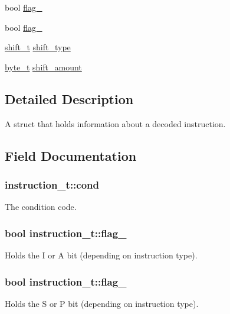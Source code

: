 \begin{DoxyCompactItemize}
\item 
bool \hyperlink{structinstruction__t_a185bd7654f18f654b666ccfe1d857659}{flag\+\_}
\item 
bool \hyperlink{structinstruction__t_a004b3ac9779d188ae99bc0c7180dab8d}{flag\+\_}
\item 
\hyperlink{global_8h_a22746cb89e8b2ed0a61876e36446f37f}{shift\+\_\+t} \hyperlink{structinstruction__t_a13483a9191b2197c4ed899f3889ad801}{shift\+\_\+type}
\item 
\hyperlink{global_8h_a0661d7d1353e0bca70c64563f635b034}{byte\+\_\+t} \hyperlink{structinstruction__t_ac6da93636b5b619f0ee7c5405b185e5d}{shift\+\_\+amount}
\end{DoxyCompactItemize}


\subsection{Detailed Description}
A struct that holds information about a decoded instruction. 

\subsection{Field Documentation}
\subsubsection[{\texorpdfstring{cond}{cond}}]{ instruction\+\_\+t\+::cond}\hypertarget{structinstruction__t_aafe48ca203b375c2b6373abd11192c3f}{}\label{structinstruction__t_aafe48ca203b375c2b6373abd11192c3f}
The condition code. 
\subsubsection[{\texorpdfstring{flag\+\_\+0}{flag_0}}]{\setlength{\rightskip}{0pt plus 5cm}bool instruction\+\_\+t\+::flag\+\_}\hypertarget{structinstruction__t_a2d1e7a105576c5bb98d45a51ef3d2e03}{}\label{structinstruction__t_a2d1e7a105576c5bb98d45a51ef3d2e03}
Holds the I or A bit (depending on instruction type). 
\subsubsection[{\texorpdfstring{flag\+\_\+1}{flag_1}}]{\setlength{\rightskip}{0pt plus 5cm}bool instruction\+\_\+t\+::flag\+\_}\hypertarget{structinstruction__t_a5e38a859429a96a7db9fbcbd452f1a70}{}\label{structinstruction__t_a5e38a859429a96a7db9fbcbd452f1a70}
Holds the S or P bit (depending on instruction type). 
